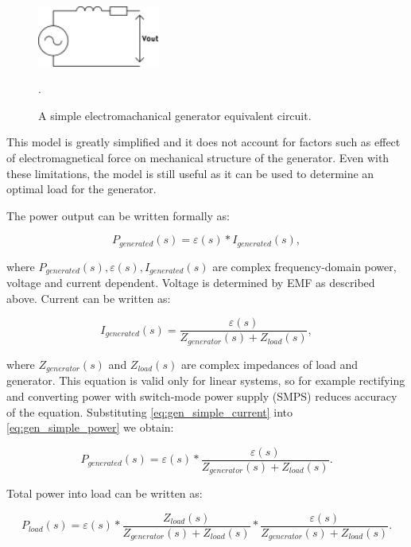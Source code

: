 \begin{figure}[htb]
\begin{center}
\includegraphics[height=2cm]{images/own_dwg/gen_simple}
\end{center}
\caption{A simple electromachanical generator equivalent circuit.}.
\label{gen_simple}
\end{figure}

This model is greatly simplified and it does not account for factors such as effect of electromagnetical force on mechanical structure of the generator. Even with these limitations, the model is still useful as it can be used to determine an optimal load for the generator. 

The power output can be written formally as:

\begin{equation} \label{eq:gen_simple_power}
  P_{generated}(s) = \varepsilon(s)*I_{generated}(s),
\end{equation}

where $P_{generated}(s), \varepsilon(s), I_{generated}(s)$ are complex frequency-domain power, voltage and current dependent. Voltage is determined by EMF as described above. Current can be written as: 

\begin{equation} \label{eq:gen_simple_current}
  I_{generated}(s) = \frac{\varepsilon(s)}{Z_{generator}(s)+Z_{load}(s)},
\end{equation}

where $Z_{generator}(s) $ and $ Z_{load}(s)$ are complex impedances of load and generator. This equation is valid only for linear systems, so for example rectifying and converting power with switch-mode power supply (SMPS) reduces accuracy of the equation. Substituting \eqref{eq:gen_simple_current} into \eqref{eq:gen_simple_power} we obtain:

\begin{equation}
  P_{generated}(s) = \varepsilon(s)*\frac{\varepsilon(s)}{Z_{generator}(s)+Z_{load}(s)}.
\end{equation}

Total power into load can be written as:

\begin{equation} \label{eq:generator_load_power}
  P_{load}(s) = \varepsilon(s)*\frac{Z_{load}(s)}{Z_{generator}(s)+Z_{load}(s)}*\frac{\varepsilon(s)}{Z_{generator}(s)+Z_{load}(s)}.
\end{equation}

